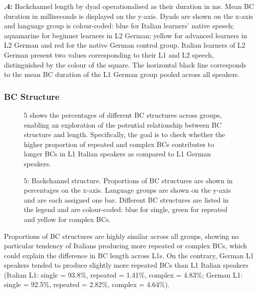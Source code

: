   
 

\begin{stylecaption}
\textbf{.4:} Backchannel length by dyad operationalised as their duration in ms. Mean BC duration in milliseconds is displayed on the y-axis. Dyads are shown on the x-axis and language group is colour-coded: blue for Italian learners’ native speech; aquamarine for beginner learners in L2 German; yellow for advanced learners in L2 German and red for the native German control group. Italian learners of L2 German present two values corresponding to their L1 and L2 speech, distinguished by the colour of the square. The horizontal black line corresponds to the mean BC duration of the L1 German group pooled across all speakers.
\end{stylecaption}

\subsubsection{BC Structure}
\hypertarget{Toc191305953}{}\begin{figure}
\caption{5 shows the percentages of different BC structures across groups, enabling an exploration of the potential relationship between BC structure and length. Specifically, the goal is to check whether the higher proportion of repeated and complex BCs contributes to longer BCs in L1 Italian speakers as compared to L1 German speakers.}
\label{fig:key:4}
\end{figure}

  
 

\begin{stylecaption}\begin{figure}
\caption{5: Backchannel structure. Proportions of BC structures are shown in percentages on the x-axis. Language groups are shown on the y-axis and are each assigned one bar. Different BC structures are listed in the legend and are colour-coded: blue for single, green for repeated and yellow for complex BCs.}
\label{fig:key:4}
\end{figure}\end{stylecaption}

Proportions of BC structures are highly similar across all groups, showing no particular tendency of Italians producing more repeated or complex BCs, which could explain the difference in BC length across L1s. On the contrary, German L1 speakers tended to produce slightly more repeated BCs than L1 Italian speakers (Italian L1: single = 93.8\%, repeated = 1.41\%, complex = 4.83\%; German L1: single = 92.5\%, repeated = 2.82\%, complex = 4.64\%).

